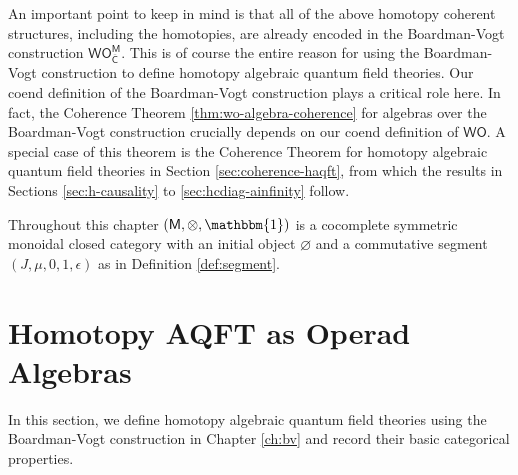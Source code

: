 \documentclass{amsbook}
\numberwithin{section}{chapter}
\numberwithin{subsection}{section}
\numberwithin{equation}{section}
\theoremstyle{plain}
\theoremstyle{definition}
\newcommand{\C}{\mathsf{C}}
\newcommand{\M}{\mathsf{M}}
\renewcommand{\O}{\mathsf{O}}
\newcommand{\W}{\mathsf{W}}
\newcommand{\tensorunit}{\mathbbm{1}}
\newcommand{\Cbar}{\overline{\C}}
\newcommand{\Ocbar}{\O_{\Cbar}}
\newcommand{\Ocbarm}{\Ocbar^{\M}}
\newcommand{\wo}{\W\O}
\newcommand{\wocbarm}{\W\Ocbarm}
\begin{document}
An important point to keep in mind is that all of the above homotopy coherent structures, including the homotopies, are already encoded in the Boardman-Vogt construction $\wocbarm$.  This is of course the entire reason for using the Boardman-Vogt construction to define homotopy algebraic quantum field theories.  Our coend definition of the Boardman-Vogt construction plays a critical role here.  In fact, the Coherence Theorem \ref{thm:wo-algebra-coherence} for algebras over the Boardman-Vogt construction crucially depends on our coend definition of $\wo$.  A special case of this theorem is the Coherence Theorem for homotopy algebraic quantum field theories in Section \ref{sec:coherence-haqft}, from which the results in Sections \ref{sec:h-causality} to \ref{sec:hcdiag-ainfinity} follow.

Throughout this chapter $(\M,\otimes,\tensorunit)$ is a cocomplete symmetric monoidal closed category with an initial object $\varnothing$ and a commutative segment $(J,\mu,0,1,\epsilon)$ as in Definition \ref{def:segment}.


\section{Homotopy AQFT as Operad Algebras}\label{sec:haqft-operad}

In this section, we define homotopy algebraic quantum field theories using the Boardman-Vogt construction in Chapter \ref{ch:bv} and record their basic categorical properties.  
\end{document}
